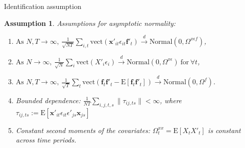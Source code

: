 \documentclass{beamer}
\newtheorem{assumption}{Assumption}
\begin{document}
\begin{frame}{Identification assumption}
\begin{assumption}
Assumptions for asymptotic normality:
\begin{enumerate}
    \item $\text{As } N, T \to \infty, \: \frac{1}{\sqrt{NT}} \sum_{i,t} \text{vect}\left( \boldsymbol{x}'_{it} \epsilon_{it} \boldsymbol{f}'_{t} \right) \xrightarrow{d} \text{Normal} \left(0, \Omega^{x\epsilon f} \right)$,
    
    \item $\text{As } N \to \infty, \: \frac{1}{\sqrt{N}} \sum_{i} \text{vect}\left( X'_{i} \epsilon_{i} \right) \xrightarrow{d} \text{Normal} \left(0, \Omega^{x\epsilon} \right) \: \text{for} \: \forall t$,
    
    \item $\text{As } N, T \to \infty, \: \frac{1}{\sqrt{T}} \sum_{t} \text{vect}\left( \boldsymbol{f}_{t}\boldsymbol{f}'_{t} - \mathrm{E}[\boldsymbol{f}_{t}\boldsymbol{f}'_{t}] \right) \xrightarrow{d} \text{Normal} \left(0, \Omega^{f} \right)$.
    
    \item Bounded dependence: $\frac{1}{NT} \sum_{i,j,t,s}\|\tau_{ij, ts}\| < \infty$, where $\tau_{ij, ts} := \mathrm{E} \left[ \boldsymbol{x}'_{it} \epsilon_{it} \epsilon'_{js} \boldsymbol{x}_{js} \right]$
    
    \item Constant second moments of the covariates: $\Omega_t^{xx} = \mathrm{E}\left[ X_{t} X'_{t} \right]$ is constant across time periods.
    \end{enumerate}
\end{assumption}
\end{frame}
\end{document}
